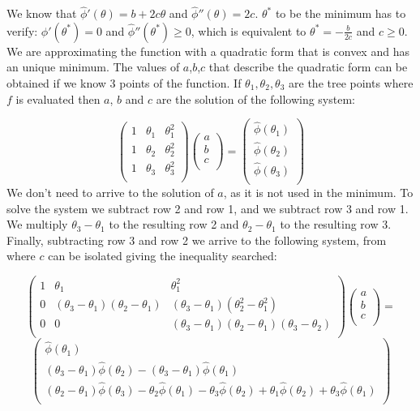 \documentclass[12pt,letterpaper]{article}
\theoremstyle{definition}
\begin{document}
 We know that $\hat{\phi}'(\theta) = b + 2c \theta $ and $\hat{\phi}''(\theta) = 2c $. $\theta^{*}$ to be the minimum has to verify: $\hat{\phi}'(\theta^{*}) = 0$ and $\hat{\phi}''(\theta^{*}) \ge 0$, which is equivalent to $\theta^{*} = - \frac{b}{2c}$ and $c\ge 0$. We are approximating the function with a quadratic form that is convex and has an unique minimum. The values of $a$,$b$,$c$ that describe the quadratic form can be obtained if we know 3 points of the function. If $\theta_1, \theta_2, \theta_3$ are the tree points where $f$ is evaluated then $a$, $b$ and $c$ are the solution of the following system:

 $$
\begin{pmatrix}
    1 & \theta_1 & \theta_1 ^2 \\
    1 & \theta_2 & \theta_2 ^2 \\
    1 & \theta_3 & \theta_3 ^2 \\
\end{pmatrix}
\begin{pmatrix}
    a \\
    b \\
    c\\
\end{pmatrix}
=
\begin{pmatrix}
    \hat{\phi}(\theta_1) \\
    \hat{\phi}(\theta_2) \\
    \hat{\phi}(\theta_3)\\
\end{pmatrix}
 $$
We don't need to arrive to the solution of $a$, as it is not used in the minimum. To solve the system we subtract row 2 and row 1, and we subtract row 3 and row 1. We multiply $ \theta_3-\theta_1$ to the resulting row 2 and $ \theta_2-\theta_1$ to the resulting row 3. Finally, subtracting row 3 and row 2 we arrive to the following system, from where $c$ can be isolated giving the inequality searched:

 $$
\begin{pmatrix}
    1 & \theta_1 & \theta_1 ^2 \\
    0 & (\theta_3 - \theta_1) (\theta_2 - \theta_1)  & (\theta_3 - \theta_1) (\theta_2 ^2-\theta_1^2) \\
    0 & 0 & (\theta_3 - \theta_1) (\theta_2 - \theta_1) (\theta_3 - \theta_2) \\
\end{pmatrix}
\begin{pmatrix}
    a \\
    b \\
    c\\
\end{pmatrix}
=
$$
$$
\begin{pmatrix}
    \hat{\phi}(\theta_1) \\
    (\theta_3 - \theta_1)\hat{\phi}(\theta_2) - (\theta_3 - \theta_1)\hat{\phi}(\theta_1)  \\
    (\theta_2 - \theta_1)\hat{\phi}(\theta_3) - \theta_2 \hat{\phi}(\theta_1)-\theta_3 \hat{\phi}(\theta_2) + \theta_1 \hat{\phi}(\theta_2) + \theta_3 \hat{\phi}(\theta_1) \\
\end{pmatrix}
 $$
 
\end{document}
